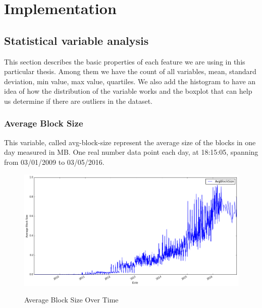 
\chapter{Implementation} %

\label{ch:implementation}


\section{Statistical variable analysis}
\label{sec:stat-var-analysis}

This section describes the basic properties of each feature we are
using in this particular thesis. Among them we have the count of all
variables, mean, standard deviation, min value, max value, quartiles.
We also add the histogram to have an idea of how the distribution of
the variable works and the boxplot that can help us determine if there
are outliers in the dataset.

\subsection{Average Block Size}
\label{sec:avg-block-size}

This variable, called avg-block-size represent the average size of the
blocks in one day measured in MB. One real number data point each day,
at 18:15:05, spanning from 03/01/2009 to 03/05/2016.

\begin{figure}[bth]
  \myfloatalign
  {\includegraphics[width=1\linewidth]
    {gfx/avg-block-size-over-time}} 
  \caption{Average Block Size Over Time}
  \label{fig:avg-block-size-over-time}
\end{figure}

